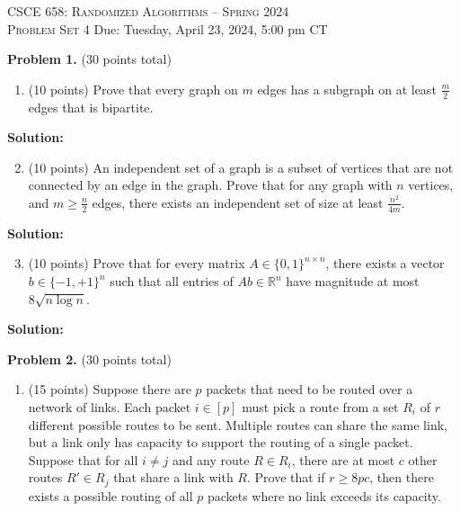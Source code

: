 \documentclass[11pt]{article}
\begin{document}
\begin{center}
{\Large\textsc{CSCE 658: Randomized Algorithms -- Spring 2024 \\ 
Problem Set 4}}
\vskip 0.1in
Due: Tuesday, April 23, 2024, 5:00 pm CT
\end{center}


\noindent
\textbf{Problem 1.} (30 points total)
\begin{enumerate}
\item (10 points)
Prove that every graph on $m$ edges has a subgraph on at least $\frac{m}{2}$ edges that is bipartite.
\end{enumerate}

\noindent\textbf{Solution:}

\begin{enumerate}
\setcounter{enumi}{1}
\item (10 points)
An independent set of a graph is a subset of vertices that are not connected by an edge in the graph. 
Prove that for any graph with $n$ vertices, and $m\ge\frac{n}{2}$ edges, there exists an independent set of
size at least $\frac{n^2}{4m}$. 
\end{enumerate}

\noindent\textbf{Solution:}

\begin{enumerate}
\setcounter{enumi}{2}
\item (10 points)
Prove that for every matrix $A\in\{0,1\}^{n\times n}$, there exists a vector $b\in\{-1,+1\}^n$ such that all entries of $Ab\in\mathbb{R}^n$ have magnitude at most $8\sqrt{n\log n}$. 
\end{enumerate}

\noindent\textbf{Solution:}




\newpage\noindent
\textbf{Problem 2.} (30 points total)
\begin{enumerate}
\item (15 points)
Suppose there are $p$ packets that need to be routed over a network of links. 
Each packet $i\in[p]$ must pick a route from a set $R_i$ of $r$ different possible routes to be sent. 
Multiple routes can share the same link, but a link only has capacity to support the routing of a single packet. 
Suppose that for all $i\neq j$ and any route $R\in R_i$, there are at most $c$ other routes $R'\in R_j$ that share a link with $R$. 
Prove that if $r\ge 8pc$, then there exists a possible routing of all $p$ packets where no link exceeds its capacity.
\end{enumerate}
\end{document}
